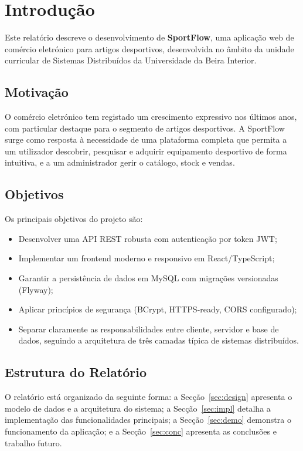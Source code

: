 \section{Introdução}

Este relatório descreve o desenvolvimento de \textbf{SportFlow}, uma aplicação web de comércio eletrónico para artigos desportivos, desenvolvida no âmbito da unidade curricular de Sistemas Distribuídos da Universidade da Beira Interior.

\subsection{Motivação}

O comércio eletrónico tem registado um crescimento expressivo nos últimos anos, com particular destaque para o segmento de artigos desportivos. A SportFlow surge como resposta à necessidade de uma plataforma completa que permita a um utilizador descobrir, pesquisar e adquirir equipamento desportivo de forma intuitiva, e a um administrador gerir o catálogo, stock e vendas.

\subsection{Objetivos}

Os principais objetivos do projeto são:

\begin{itemize}
    \item Desenvolver uma API REST robusta com autenticação por token JWT;
    \item Implementar um frontend moderno e responsivo em React/TypeScript;
    \item Garantir a persistência de dados em MySQL com migrações versionadas (Flyway);
    \item Aplicar princípios de segurança (BCrypt, HTTPS-ready, CORS configurado);
    \item Separar claramente as responsabilidades entre cliente, servidor e base de dados, seguindo a arquitetura de três camadas típica de sistemas distribuídos.
\end{itemize}

\subsection{Estrutura do Relatório}

O relatório está organizado da seguinte forma: a Secção~\ref{sec:design} apresenta o modelo de dados e a arquitetura do sistema; a Secção~\ref{sec:impl} detalha a implementação das funcionalidades principais; a Secção~\ref{sec:demo} demonstra o funcionamento da aplicação; e a Secção~\ref{sec:conc} apresenta as conclusões e trabalho futuro.
